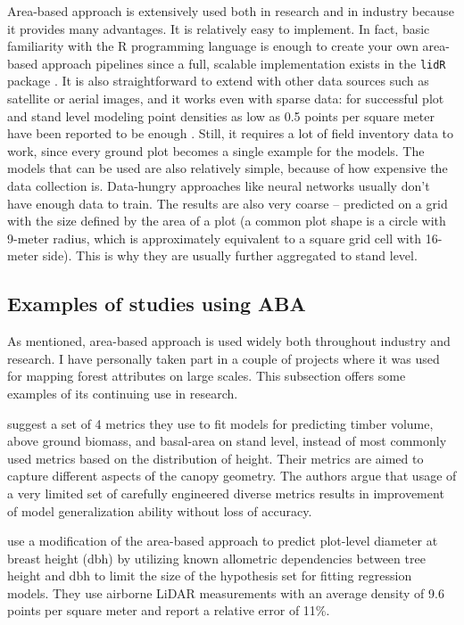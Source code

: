 Area-based approach is extensively used both in research and in industry because it provides many advantages.
It is relatively easy to implement.
In fact, basic familiarity with the R programming language is enough to create your own area-based approach pipelines since a full, scalable implementation exists in the \texttt{lidR} package \citep{rousselLidRPackage2020}.
It is also straightforward to extend with other data sources such as satellite or aerial images, and it works even with sparse data: for successful plot and stand level modeling point densities as low as 0.5 points per square meter have been reported to be enough \citep{treitzLiDARSamplingDensity2012, jakubowskiTradeoffsLidarPulse2013}.
Still, it requires a lot of field inventory data to work, since every ground plot becomes a single example for the models.
The models that can be used are also relatively simple, because of how expensive the data collection is.
Data-hungry approaches like neural networks usually don't have enough data to train.
The results are also very coarse – predicted on a grid with the size defined by the area of a plot (a common plot shape is a circle with 9-meter radius, which is approximately equivalent to a square grid cell with 16-meter side).
This is why they are usually further aggregated to stand level.

\subsection{Examples of studies using ABA}

As mentioned, area-based approach is used widely both throughout industry and research.
I have personally taken part in a couple of projects where it was used for mapping forest attributes on large scales.
This subsection offers some examples of its continuing use in research.

\citet{bouvierGeneralizingPredictiveModels2015} suggest a set of 4 metrics they use to fit models for predicting timber volume, above ground biomass, and basal-area on stand level, instead of most commonly used metrics based on the distribution of height.
Their metrics are aimed to capture different aspects of the canopy geometry.
The authors argue that usage of a very limited set of carefully engineered diverse metrics results in improvement of model generalization ability without loss of accuracy.

\citet{zhangImprovedAreabasedApproach2023} use a modification of the area-based approach to predict plot-level diameter at breast height (dbh) by utilizing known allometric dependencies between tree height and dbh to limit the size of the hypothesis set for fitting regression models.
They use airborne LiDAR measurements with an average density of 9.6 points per square meter and report a relative error of 11\%.

